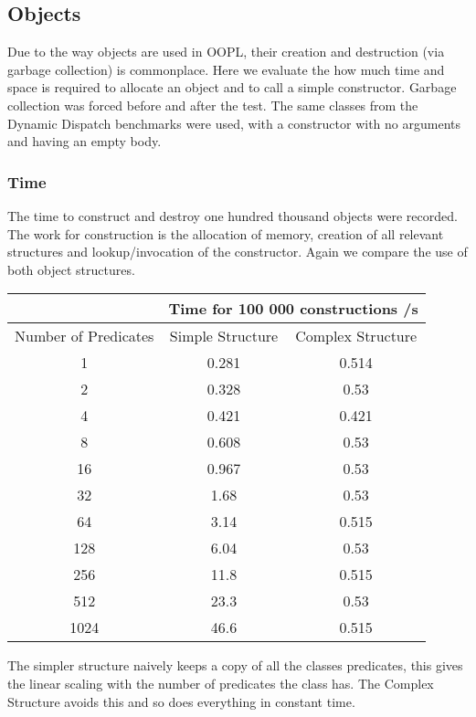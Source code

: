 \documentclass[12pt,a4paper,twoside,openright]{report}
\begin{document}
\subsection{Objects}

Due to the way objects are used in OOPL, their creation and destruction (via garbage collection) is commonplace. Here we evaluate the how much time and space is required to allocate an object and to call a simple constructor. Garbage collection was forced before and after the test. The same classes from the Dynamic Dispatch benchmarks were used, with a constructor with no arguments and having an empty body.

\subsubsection{Time}

The time to construct and destroy one hundred thousand objects were recorded. The work for construction is the allocation of memory, creation of all relevant structures and lookup/invocation of the constructor. Again we compare the use of both object structures.

\begin{center}
\begin{tabular}{c|c|c}

& \multicolumn{2}{c}{Time for 100 000 constructions /s} \\
\hline
Number of Predicates & Simple Structure & Complex Structure \\
\hline
1	&	0.281		&	0.514	\\
2	&	0.328		&	0.53	\\
4	&	0.421		&	0.421	\\
8	&	0.608		&	0.53	\\
16	&	0.967		&	0.53	\\
32	&	1.68		&	0.53	\\
64	&	3.14		&	0.515	\\
128	&	6.04		&	0.53	\\
256	&	11.8		&	0.515	\\
512	&	23.3		&	0.53	\\
1024	&	46.6		&	0.515	\\


\end{tabular}
\end{center}

The simpler structure naively keeps a copy of all the classes predicates, this gives the linear scaling with the number of predicates the class has. The Complex Structure avoids this and so does everything in constant time.
\end{document}

